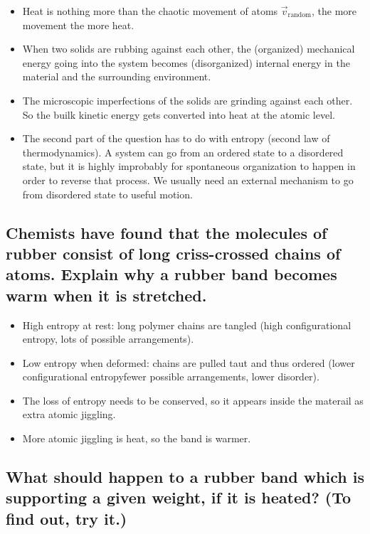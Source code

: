 \documentclass{article}
\begin{document}
\begin{itemize}
    \item Heat is nothing more than the chaotic movement of atoms $\vec{v}_{\text{random}}$, the more movement the more heat. 
    \item When two solids are rubbing against each other, the (organized) mechanical energy going into the system becomes (disorganized) internal energy in the material and the surrounding environment.
    \item The microscopic imperfections of the solids are grinding against each other. So the builk kinetic energy gets converted into heat at the atomic level.
    \item The second part of the question has to do with entropy (second law of thermodynamics). A system can go from an ordered state to a disordered state, but it is highly improbably for spontaneous organization to happen in order to reverse that process. We usually need an external mechanism to go from disordered state to useful motion.
\end{itemize}

\subsection{Chemists have found that the molecules of rubber consist of long criss-crossed chains of atoms. Explain why a rubber band becomes warm when it is stretched.}

\begin{itemize}
    \item High entropy at rest: long polymer chains are tangled (high configurational entropy, lots of possible arrangements).
    \item Low entropy when deformed: chains are pulled taut and thus ordered (lower configurational entropyfewer possible arrangements, lower disorder).
    \item The loss of entropy needs to be conserved, so it appears inside the materail as extra atomic jiggling.
    \item More atomic jiggling is heat, so the band is warmer.
\end{itemize}

\subsection{What should happen to a rubber band which is supporting a given weight, if it is heated? (To find out, try it.)}
\end{document}
